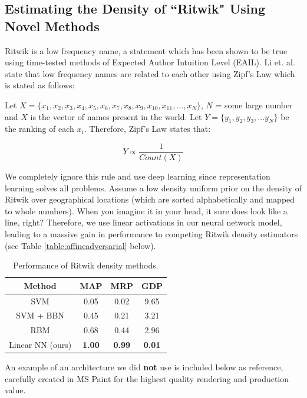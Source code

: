 \documentclass[]{article}
\begin{document}
\subsection{Estimating the Density of ``Ritwik" Using Novel Methods}
Ritwik is a low frequency name, a statement which has been shown to be true using time-tested methods of Expected Author Intuition Level (EAIL). Li et. al. \cite{Baby} state that low frequency names are related to each other using Zipf's Law which is stated as follows:

\vspace{2mm}
Let $X = \{x_1, x_2, x_3, x_4, x_5, x_6, x_7, x_8, x_9, x_{10}, x_{11}, ... , x_N\}$, $N$ = some large number and $X$ is the vector of names present in the world. Let $Y = \{y_1, y_2, y_3, ... y_N\}$ be the ranking of each $x_i$. Therefore, Zipf's Law states that:

\begin{equation}
Y \propto \frac{1}{Count(X)}
\end{equation}

We completely ignore this rule and use deep learning since representation learning solves all problems. Assume a low density uniform prior on the density of Ritwik over geographical locations (which are sorted alphabetically and mapped to whole numbers). When you imagine it in your head, it sure does look like a line, right? Therefore, we use linear activations in our neural network model, leading to a massive gain in performance to competing Ritwik density estimators (see Table \ref{table:affineadversarial} below).

\begin{table}[h]
\centering
\begin{tabular}{|c|c|c|c|}
	\hline
	\textbf{Method} & \textbf{MAP} & \textbf{MRP} & \textbf{GDP} \\
	\hline
	SVM & 0.05 & 0.02 & 9.65 \\
	\hline
	SVM + BBN & 0.45 & 0.21 & 3.21 \\
	\hline
	RBM & 0.68 & 0.44 & 2.96 \\
	\hline
	Linear NN (ours) & \textbf{1.00} & \textbf{0.99} & \textbf{0.01}\\
	\hline
\end{tabular}
\caption{Performance of Ritwik density methods.}
\label{table:densitycomp}
\end{table}

An example of an architecture we did \textbf{not} use is included below as reference, carefully created in MS Paint for the highest quality rendering and production value.
\end{document}
